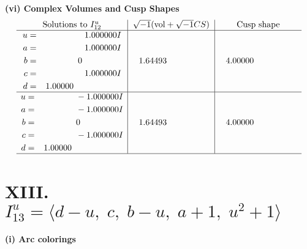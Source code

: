 \documentclass[1p]{elsarticle_modified}
\theoremstyle{definition}
\newcommand{\I}{\sqrt{-1}}
\begin{document}
\newpage\flushleft \textbf{(vi) Complex Volumes and Cusp Shapes}
$$\begin{array}{c|c|c}  
\text{Solutions to }I^u_{12}& \I (\text{vol} + \sqrt{-1}CS) & \text{Cusp shape}\\
 \hline 
\begin{aligned}
u &= \phantom{-0.000000 -}1.000000 I \\
a &= \phantom{-0.000000 -}1.000000 I \\
b &= \phantom{-0.000000 } 0 \\
c &= \phantom{-0.000000 -}1.000000 I \\
d &= \phantom{-}1.00000\phantom{ +0.000000I}\end{aligned}
 & \phantom{-}1.64493\phantom{ +0.000000I} & \phantom{-}4.00000\phantom{ +0.000000I} \\ \hline\begin{aligned}
u &= \phantom{-0.000000 } -1.000000 I \\
a &= \phantom{-0.000000 } -1.000000 I \\
b &= \phantom{-0.000000 } 0 \\
c &= \phantom{-0.000000 } -1.000000 I \\
d &= \phantom{-}1.00000\phantom{ +0.000000I}\end{aligned}
 & \phantom{-}1.64493\phantom{ +0.000000I} & \phantom{-}4.00000\phantom{ +0.000000I}\\
 \hline 
 \end{array}$$\newpage\newpage\renewcommand{\arraystretch}{1}
\centering \section*{XIII. $I^u_{13}= \langle d- u,\;c,\;b- u,\;a+1,\;u^2+1 \rangle$}
\flushleft \textbf{(i) Arc colorings}\\
\end{document}
